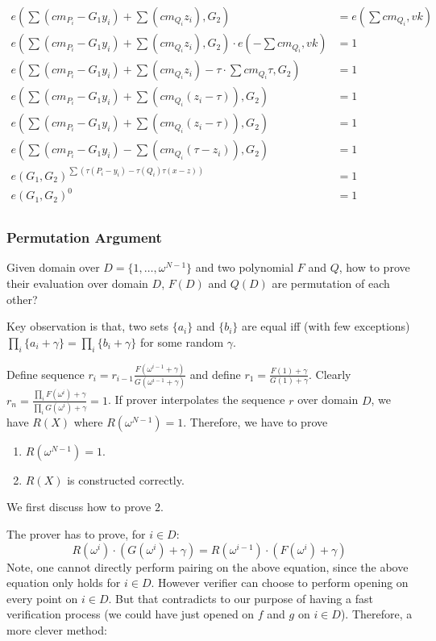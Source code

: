 \documentclass[10pt]{article}
\begin{document}
\[
\begin{aligned}
    e(\sum{(cm_{P_i} - G_1 y_i)} + \sum{(cm_{Q_i} z_i)}, G_2) &= e(\sum{cm_{Q_i}}, vk)\\
    e(\sum{(cm_{P_i} - G_1 y_i)} + \sum{(cm_{Q_i} z_i)}, G_2) \cdot e(-\sum{cm_{Q_i}}, vk) &= 1 \\
    e(\sum{(cm_{P_i} - G_1 y_i)} + \sum{(cm_{Q_i} z_i)} - \tau \cdot \sum{cm_{Q_i}\tau}, G_2) &= 1 \\
    e(\sum{(cm_{P_i} - G_1 y_i)} + \sum{(cm_{Q_i} (z_i-\tau))}, G_2) &= 1 \\
    e(\sum{(cm_{P_i} - G_1 y_i)} + \sum{(cm_{Q_i} (z_i-\tau))}, G_2) &= 1 \\
    e(\sum{(cm_{P_i} - G_1 y_i)} - \sum{(cm_{Q_i} (\tau - z_i))}, G_2) &= 1 \\
    e(G_1, G_2)^{\sum{(\tau(P_i - y_i) - \tau(Q_i)\tau(x-z))}} &= 1 \\
    e(G_1, G_2)^0 &= 1\\
\end{aligned}
\]

\subsubsection{Permutation Argument}
Given domain over $D=\{1, \ldots, \omega^{N-1}\}$ and two
polynomial $F$ and $Q$, how to prove their evaluation over domain $D$, $F(D)$
and $Q(D)$ are permutation of each other?

Key observation is that, two sets $\{a_i\}$ and $\{b_i\}$ are equal iff (with
few exceptions) $\prod_i\{a_i + \gamma\} = \prod_i\{b_i + \gamma\}$ for some
random $\gamma$.

Define sequence $r_i =
r_{i-1}\frac{F(\omega^{i-1}+\gamma)}{G(\omega^{i-1}+\gamma)}$ 
and define $r_1 = \frac{F(1)+\gamma}{G(1)+\gamma}$.
Clearly $r_{n} = \frac{\prod_iF(\omega^{i}) + \gamma}{\prod_iG(\omega^{i}) +
\gamma} = 1$.
If prover interpolates the sequence $r$ over domain $D$, we have $R(X)$ where
$R(\omega^{N-1}) = 1$.
Therefore, we have to prove
\begin{enumerate}
    \item $R(\omega^{N-1}) = 1$.
    \item $R(X)$ is constructed correctly.
\end{enumerate}
We first discuss how to prove $2$.

The prover has to prove, for $i \in D$:
\[
R(\omega^i)\cdot(G(\omega^{i}) + \gamma) = R(\omega^{i-1})\cdot (F(\omega^{i}) + \gamma)
\]
Note, one cannot directly perform pairing on the above equation,
since the above equation only holds for $i \in D$.
However verifier can choose to perform opening on every point on $i\in D$. But
 that contradicts to our purpose of having a fast verification process (we
 could have just opened on $f$ and $g$ on $i \in D$).
Therefore, a more clever method:
\end{document}
